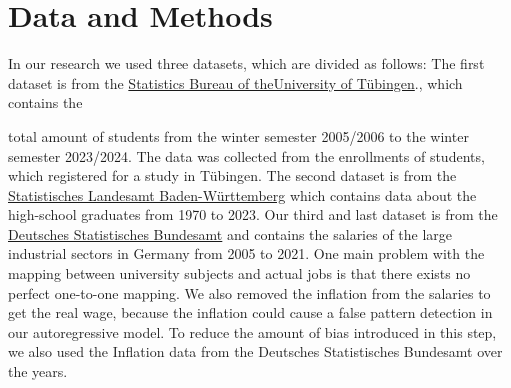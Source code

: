\documentclass{article}
\theoremstyle{plain}
\theoremstyle{definition}
\theoremstyle{remark}
\begin{document}
\section{Data and Methods}\label{sec:methods}

In our research we used three datasets, which are divided as follows: The first dataset is from the \href{https://uni-tuebingen.de/einrichtungen/verwaltung/iv-studierende/studierendenabteilung/statistiken/}{Statistics Bureau of theUniversity of Tübingen}., which contains the

total amount of students from the winter semester 2005/2006 to the winter semester 2023/2024. The data was collected from the enrollments of students, which registered 
for a study in Tübingen.
The second dataset is from the \href{https://www.statistik-bw.de/BildungKultur/SchulenAllgem/LRt0302.jsp}{Statistisches Landesamt Baden-Württemberg} which contains data about the high-school graduates from 1970 to 2023.
Our third and last dataset is from the \href{https://www-genesis.destatis.de/genesis//online?operation=table&code=62321-0001&bypass=true&levelindex=0&levelid=1702307320529#abreadcrumb}{Deutsches Statistisches Bundesamt} and contains the salaries of the large industrial sectors in Germany from 2005 to 2021. 
One main problem with the mapping between university subjects and actual jobs is that there exists no perfect one-to-one mapping. 
We also removed the inflation from the salaries to get the real wage, because the inflation could 
cause a false pattern detection in our autoregressive model. 
To reduce the amount of bias introduced in this step, we also used the Inflation data from the Deutsches Statistisches Bundesamt over the years.\\
\end{document}
